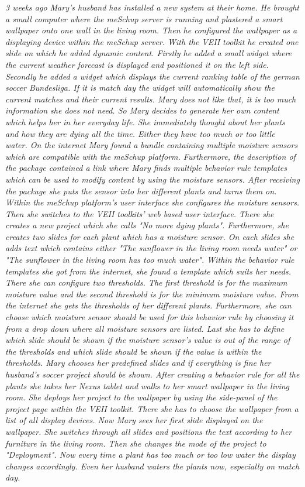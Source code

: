 \textit{
3 weeks ago Mary's husband has installed a new system at their home. He brought a small computer where the meSchup server is running and plastered a smart wallpaper onto one wall in the living room. Then he configured the wallpaper as a displaying device within the meSchup server. With the VEII toolkit he created one slide on which he added dynamic content. Firstly he added a small widget where the current weather forecast is displayed and positioned it on the left side. Secondly he added a widget which displays the current ranking table of the german soccer Bundesliga. If it is match day the widget will automatically show the current matches and their current results. Mary does not like that, it is too much information she does not need. So Mary decides to generate her own content which helps her in her everyday life. She immediately thought about her plants and how they are dying all the time. Either they have too much or too little water. On the internet Mary found a bundle containing multiple moisture sensors which are compatible with the meSchup platform. Furthermore, the description of the package contained a link where Mary finds multiple behavior rule templates which can be used to modify content by using the moisture sensors. After receiving the package she puts the sensor into her different plants and turns them on. Within the meSchup platform's user interface she configures the moisture sensors. Then she switches to the VEII toolkits' web based user interface. There she creates a new project which she calls "No more dying plants". Furthermore, she creates two slides for each plant which has a moisture sensor. On each slides she adds text which contains either "The sunflower in the living room needs water" or "The sunflower in the living room has too much water". Within the behavior rule templates she got from the internet, she found a template which suits her needs. There she can configure two thresholds. The first threshold is for the maximum moisture value and the second threshold is for the minimum moisture value. From the internet she gets the thresholds of her different plants. Furthermore, she can choose which moisture sensor should be used for this behavior rule by choosing it from a drop down where all moisture sensors are listed. Last she has to define which slide should be shown if the moisture sensor's value is out of the range of the thresholds and which slide should be shown if the value is within the thresholds. Mary chooses her predefined slides and if everything is fine her husband's soccer project should be shown. After creating a behavior rule for all the plants she takes her Nexus tablet and walks to her smart wallpaper in the living room. She deploys her project to the wallpaper by using the side-panel of the project page within the VEII toolkit. There she has to choose the wallpaper from a list of all display devices. Now Mary sees her first slide displayed on the wallpaper. She switches through all slides and positions the text according to her furniture in the living room. Then she changes the mode of the project to "Deployment". Now every time a plant has too much or too low water the display changes accordingly. Even her husband waters the plants now, especially on match day.
}